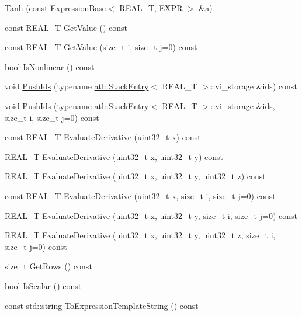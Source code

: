 \begin{DoxyCompactItemize}
\item 
\hyperlink{structatl_1_1_tanh_a653bd91c7ede867cdd382d463936cecd}{Tanh} (const \hyperlink{structatl_1_1_expression_base}{Expression\+Base}$<$ R\+E\+A\+L\+\_\+\+T, E\+X\+P\+R $>$ \&a)
\item 
const R\+E\+A\+L\+\_\+\+T \hyperlink{structatl_1_1_tanh_af7853c511c4b0c2cb8f5ac8940f6a9bb}{Get\+Value} () const 
\item 
const R\+E\+A\+L\+\_\+\+T \hyperlink{structatl_1_1_tanh_a109ae48d7db65d57faeff76a2673e746}{Get\+Value} (size\+\_\+t i, size\+\_\+t j=0) const 
\item 
bool \hyperlink{structatl_1_1_tanh_aa2f425590c9ded0fabfa5d07c8235e41}{Is\+Nonlinear} () const 
\item 
void \hyperlink{structatl_1_1_tanh_a533181c192a4fa20640ae523586f76aa}{Push\+Ids} (typename \hyperlink{structatl_1_1_stack_entry}{atl\+::\+Stack\+Entry}$<$ R\+E\+A\+L\+\_\+\+T $>$\+::vi\+\_\+storage \&ids) const 
\item 
void \hyperlink{structatl_1_1_tanh_ad42e0b192892e0541633e0444f8f2874}{Push\+Ids} (typename \hyperlink{structatl_1_1_stack_entry}{atl\+::\+Stack\+Entry}$<$ R\+E\+A\+L\+\_\+\+T $>$\+::vi\+\_\+storage \&ids, size\+\_\+t i, size\+\_\+t j=0) const 
\item 
const R\+E\+A\+L\+\_\+\+T \hyperlink{structatl_1_1_tanh_a4564fcb43c3c39e01345fc9f1c2e2a10}{Evaluate\+Derivative} (uint32\+\_\+t x) const 
\item 
R\+E\+A\+L\+\_\+\+T \hyperlink{structatl_1_1_tanh_aeb4b49d9d17e12bc7fe34f2baba39e9d}{Evaluate\+Derivative} (uint32\+\_\+t x, uint32\+\_\+t y) const 
\item 
R\+E\+A\+L\+\_\+\+T \hyperlink{structatl_1_1_tanh_a1b74204c2742d5815cf15dbcde27f312}{Evaluate\+Derivative} (uint32\+\_\+t x, uint32\+\_\+t y, uint32\+\_\+t z) const 
\item 
const R\+E\+A\+L\+\_\+\+T \hyperlink{structatl_1_1_tanh_aa26a93417f964d20f6a93cbcda969bae}{Evaluate\+Derivative} (uint32\+\_\+t x, size\+\_\+t i, size\+\_\+t j=0) const 
\item 
R\+E\+A\+L\+\_\+\+T \hyperlink{structatl_1_1_tanh_a22bb2b84e980e041d8d2bd53e14867ed}{Evaluate\+Derivative} (uint32\+\_\+t x, uint32\+\_\+t y, size\+\_\+t i, size\+\_\+t j=0) const 
\item 
R\+E\+A\+L\+\_\+\+T \hyperlink{structatl_1_1_tanh_aa18358c27e07440157ed6b3649d8c06b}{Evaluate\+Derivative} (uint32\+\_\+t x, uint32\+\_\+t y, uint32\+\_\+t z, size\+\_\+t i, size\+\_\+t j=0) const 
\item 
size\+\_\+t \hyperlink{structatl_1_1_tanh_a7aada8d9c8678e5f0b763891cb16e854}{Get\+Rows} () const 
\item 
bool \hyperlink{structatl_1_1_tanh_a5beb83847e4cff2be39a4c4f82ee1ad7}{Is\+Scalar} () const 
\item 
const std\+::string \hyperlink{structatl_1_1_tanh_aa6cc749fc9a7b2087d2aed110bcf0871}{To\+Expression\+Template\+String} () const 
\end{DoxyCompactItemize}
